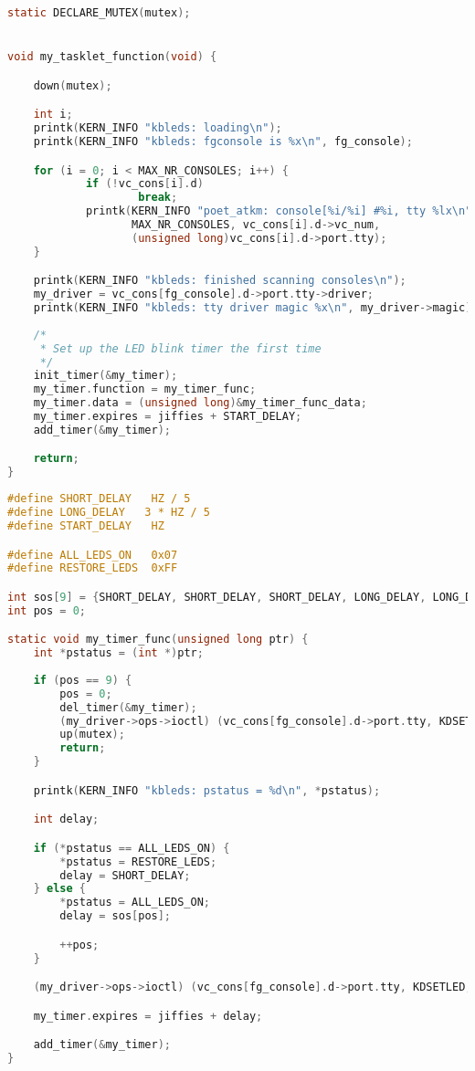 \begin{lstlisting}[language=C, caption={Поставновка таймера на выполнение},label=lab1]
static DECLARE_MUTEX(mutex);


void my_tasklet_function(void) {

	down(mutex);

	int i;
    printk(KERN_INFO "kbleds: loading\n");
    printk(KERN_INFO "kbleds: fgconsole is %x\n", fg_console);

    for (i = 0; i < MAX_NR_CONSOLES; i++) {
            if (!vc_cons[i].d)
                    break;
            printk(KERN_INFO "poet_atkm: console[%i/%i] #%i, tty %lx\n", i,
                   MAX_NR_CONSOLES, vc_cons[i].d->vc_num,
                   (unsigned long)vc_cons[i].d->port.tty);
    }

    printk(KERN_INFO "kbleds: finished scanning consoles\n");
    my_driver = vc_cons[fg_console].d->port.tty->driver;
    printk(KERN_INFO "kbleds: tty driver magic %x\n", my_driver->magic);
    
    /*
     * Set up the LED blink timer the first time
     */
    init_timer(&my_timer);
    my_timer.function = my_timer_func;
    my_timer.data = (unsigned long)&my_timer_func_data;
    my_timer.expires = jiffies + START_DELAY;
    add_timer(&my_timer);

    return;
}
\end{lstlisting}

\begin{lstlisting}[language=C, caption={Функция таймера, включающая/выключающая индикаторы},label=lab2]
#define SHORT_DELAY   HZ / 5
#define LONG_DELAY   3 * HZ / 5
#define START_DELAY   HZ

#define ALL_LEDS_ON   0x07
#define RESTORE_LEDS  0xFF

int sos[9] = {SHORT_DELAY, SHORT_DELAY, SHORT_DELAY, LONG_DELAY, LONG_DELAY, LONG_DELAY, SHORT_DELAY, SHORT_DELAY, SHORT_DELAY};
int pos = 0;

static void my_timer_func(unsigned long ptr) {
	int *pstatus = (int *)ptr;
	
	if (pos == 9) {
		pos = 0;
		del_timer(&my_timer);
	    (my_driver->ops->ioctl) (vc_cons[fg_console].d->port.tty, KDSETLED, RESTORE_LEDS);
		up(mutex);
	    return;
	}

	printk(KERN_INFO "kbleds: pstatus = %d\n", *pstatus);

	int delay;

    if (*pstatus == ALL_LEDS_ON) {
        *pstatus = RESTORE_LEDS;
		delay = SHORT_DELAY;
    } else {
		*pstatus = ALL_LEDS_ON;
		delay = sos[pos];

		++pos;
    }

    (my_driver->ops->ioctl) (vc_cons[fg_console].d->port.tty, KDSETLED, *pstatus);

    my_timer.expires = jiffies + delay;

    add_timer(&my_timer);
}
\end{lstlisting}


